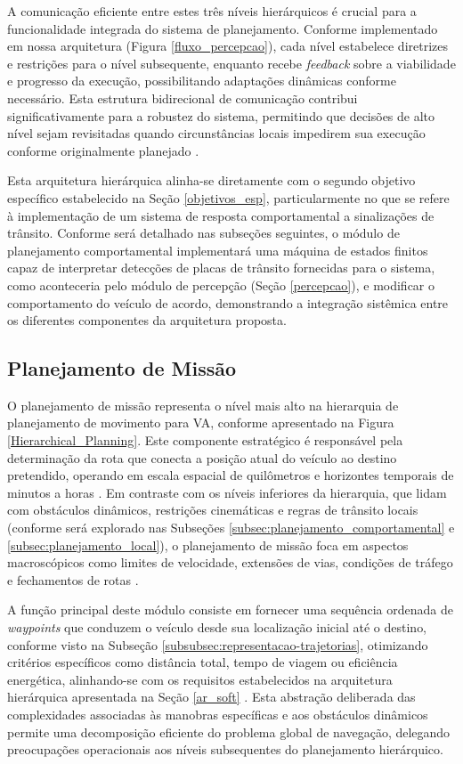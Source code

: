 A comunicação eficiente entre estes três níveis hierárquicos é crucial para a funcionalidade integrada do sistema de planejamento. Conforme implementado em nossa arquitetura (Figura \ref{fluxo_percepcao}), cada nível estabelece diretrizes e restrições para o nível subsequente, enquanto recebe \textit{feedback} sobre a viabilidade e progresso da execução, possibilitando adaptações dinâmicas conforme necessário. Esta estrutura bidirecional de comunicação contribui significativamente para a robustez do sistema, permitindo que decisões de alto nível sejam revisitadas quando circunstâncias locais impedirem sua execução conforme originalmente planejado \cite{paden2016survey}.

Esta arquitetura hierárquica alinha-se diretamente com o segundo objetivo específico estabelecido na Seção \ref{objetivos_esp}, particularmente no que se refere à implementação de um sistema de resposta comportamental a sinalizações de trânsito. Conforme será detalhado nas subseções seguintes, o módulo de planejamento comportamental implementará uma máquina de estados finitos capaz de interpretar detecções de placas de trânsito fornecidas para o sistema, como aconteceria pelo módulo de percepção (Seção \ref{percepcao}), e modificar o comportamento do veículo de acordo, demonstrando a integração sistêmica entre os diferentes componentes da arquitetura proposta.

\subsection{Planejamento de Missão} \label{subsec:planejamento_de_missao}

O planejamento de missão representa o nível mais alto na hierarquia de planejamento de movimento para VA, conforme apresentado na Figura \ref{Hierarchical_Planning}. Este componente estratégico é responsável pela determinação da rota que conecta a posição atual do veículo ao destino pretendido, operando em escala espacial de quilômetros e horizontes temporais de minutos a horas \cite{paden2016survey}. Em contraste com os níveis inferiores da hierarquia, que lidam com obstáculos dinâmicos, restrições cinemáticas e regras de trânsito locais (conforme será explorado nas Subseções \ref{subsec:planejamento_comportamental} e \ref{subsec:planejamento_local}), o planejamento de missão foca em aspectos macroscópicos como limites de velocidade, extensões de vias, condições de tráfego e fechamentos de rotas \cite{University_of_Toronto2018-mp}.

A função principal deste módulo consiste em fornecer uma sequência ordenada de \textit{waypoints} que conduzem o veículo desde sua localização inicial até o destino, conforme visto na Subseção \ref{subsubsec:representacao-trajetorias}, otimizando critérios específicos como distância total, tempo de viagem ou eficiência energética, alinhando-se com os requisitos estabelecidos na arquitetura hierárquica apresentada na Seção \ref{ar_soft} \cite{lavalle2006planning}. Esta abstração deliberada das complexidades associadas às manobras específicas e aos obstáculos dinâmicos permite uma decomposição eficiente do problema global de navegação, delegando preocupações operacionais aos níveis subsequentes do planejamento hierárquico.

